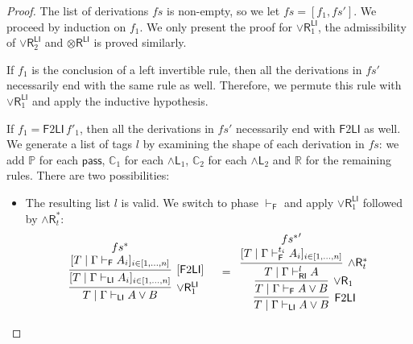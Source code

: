 \documentclass[submission,copyright,creativecommons]{eptcs}
\theoremstyle{definition}
\newcommand{\tr}{\otimes \mathsf{R}}
\newcommand{\pass}{\mathsf{pass}}
\newcommand{\andlone}{\land \mathsf{L}_{1}}
\newcommand{\andltwo}{\land \mathsf{L}_{2}}
\newcommand{\andr}{\land \mathsf{R}}
\newcommand{\orrone}{\lor \mathsf{R}_{1}}
\newcommand{\orrtwo}{\lor \mathsf{R}_{2}}
\newcommand{\RI}{\mathsf{RI}}
\newcommand{\LI}{\mathsf{LI}}
\newcommand{\F}{\mathsf{F}}
\newcommand{\tP}{\mathbb{P}}
\newcommand{\tCone}{\mathbb{C}_1}
\newcommand{\tCtwo}{\mathbb{C}_2}
\newcommand{\tE}{\mathbb{R}}
\newcommand{\proofbox}[1]{\begin{tabular}{l} #1 \end{tabular}}
\newcommand\niccolo[1]{\mbox{}
{\marginpar{\color{red}NV}}
{\sf\noindent\color{red}#1}}%
\begin{document}
\begin{proof}
  The list of derivations $fs$ is non-empty, so we let $fs = [f_1 , fs']$.
  We proceed by induction on $f_1$.
  We only present the proof for $\orrone^{\LI}$, the admissibility of $\orrtwo^{\LI}$ and $\tr^{\LI}$ is proved similarly.
  
  If $f_1$ is the conclusion of a left invertible rule, then all the derivations in $fs'$ necessarily end with the same rule as well.
  Therefore, we permute this rule with $\orrone^{\LI}$ and apply the inductive hypothesis.
  
  If $f_1 = \F 2 \LI \,f'_1$, then all the derivations in $fs'$ necessarily end with $\F 2 \LI$ as well. %
    We generate a list of tags $l$ by examining the shape of each derivation in $fs$: we add $\tP$ for each $\pass$, $\tCone$ for each $\andlone$, $\tCtwo$ for each $\andltwo$ and $\tE$ for the remaining rules.
    There are two possibilities:
    \begin{itemize}
      \item The resulting list $l$ is valid. We switch to phase $\vdash_\F$ and apply  $\orrone^{\LI}$ followed by $\andr^{*}_{t}$:
      \begin{displaymath}
        \begin{array}{cc}
          \proofbox{
          \infer[\orrone^{\LI}]{T \mid \Gamma \vdash_{\LI} A \lor B}{
            \infer[ {[\F 2 \LI]} ]{[T \mid \Gamma \vdash_{\LI} A_i]_{i \in [1 , \dots , n]}}{
              \deduce{[T \mid \Gamma \vdash_{\F} A_i]_{i \in [1 , \dots , n]}}{fs^{*}}
            }
          }
          }
          &
          =
          \proofbox{
          \infer[\F 2 \LI]{T \mid \Gamma \vdash_{\LI} A \lor B}{
            \infer[\orrone]{T \mid \Gamma \vdash_{\F} A \lor B}{
              \infer[\andr^{*}_t]{T \mid \Gamma \vdash^{l}_{\RI} A}{
                \deduce{[T \mid \Gamma \vdash^{t_i}_{\F} A_i]_{i \in [1 , \dots , n]}}{{fs^{*}}'}
              }
            }
          }
        }
        \end{array}
      \end{displaymath}

\end{itemize}
\end{proof}
\end{document}
